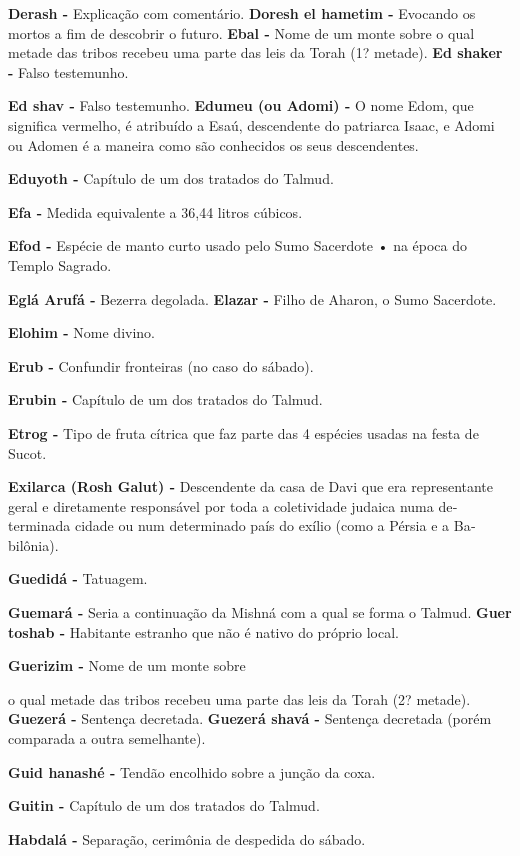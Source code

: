 \textbf{Derash -} Explicação com comentário. \textbf{Doresh el hametim
-} Evocando os mortos a fim de descobrir o futuro. \textbf{Ebal -} Nome
de um monte sobre o qual metade das tribos recebeu uma parte das leis da
Torah (1? metade). \textbf{Ed shaker -} Falso testemunho.

\textbf{Ed shav -} Falso testemunho. \textbf{Edumeu (ou Adomi) -} O nome
Edom, que significa vermelho, é atri­buído a Esaú, descendente do
patriar­ca Isaac, e Adomi ou Adomen é a ma­neira como são conhecidos os
seus descendentes.

\textbf{Eduyoth -} Capítulo de um dos trata­dos do Talmud.

\textbf{Efa -} Medida equivalente a 36,44 litros cúbicos.

\textbf{Efod -} Espécie de manto curto usado pelo Sumo Sacerdote • na
época do Templo Sagrado.

\textbf{Eglá Arufá -} Bezerra degolada. \textbf{Elazar -} Filho de
Aharon, o Sumo Sa­cerdote.

\textbf{Elohim -} Nome divino.

\textbf{Erub -} Confundir fronteiras (no caso do sábado).

\textbf{Erubin -} Capítulo de um dos tratados do Talmud.

\textbf{Etrog -} Tipo de fruta cítrica que faz parte das 4 espécies
usadas na festa de Sucot.

\textbf{Exilarca (Rosh Galut) -} Descenden­te da casa de Davi que era
representan­te geral e diretamente responsável por toda a coletividade
judaica numa de­terminada cidade ou num determina­do país do exílio
(como a Pérsia e a Ba­bilônia).

\textbf{Guedidá -} Tatuagem.

\textbf{Guemará -} Seria a continuação da Mishná com a qual se forma o
Talmud. \textbf{Guer toshab -} Habitante estranho que não é nativo do
próprio local.

\textbf{Guerizim -} Nome de um monte sobre

o qual metade das tribos recebeu uma parte das leis da Torah (2?
metade). \textbf{Guezerá -} Sentença decretada. \textbf{Guezerá shavá -}
Sentença decreta­da (porém comparada a outra seme­lhante).

\textbf{Guid hanashé -} Tendão encolhido so­bre a junção da coxa.

\textbf{Guitin -} Capítulo de um dos tratados do Talmud.

\textbf{Habdalá -} Separação, cerimônia de despedida do sábado.

